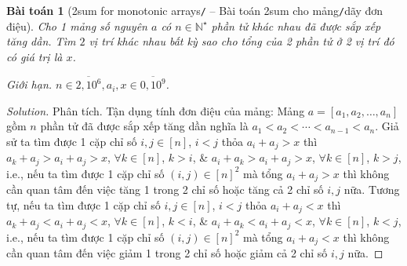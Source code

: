\documentclass{article}
\newtheorem{baitoan}{Bài toán}
\begin{document}
\begin{center}
\end{center}

\begin{baitoan}[{\sc2sum} for monotonic arrays{\tt/} -- Bài toán {\sc2sum} cho mảng{\tt/}dãy đơn điệu]
    Cho 1 mảng số nguyên $a$ có $n\in\mathbb{N}^\star$ phần tử khác nhau đã được sắp xếp tăng dần. Tìm $2$ vị trí khác nhau bất kỳ sao cho tổng của 2 phần tử ở 2 vị trí đó có giá trị là $x$.
    \item {\sf Giới hạn.} $n\in\overline{2,10^6},a_i,x\in\overline{0,10^9}$.
\end{baitoan}

\begin{proof}[Solution]
    \item {\sf Phân tích.} Tận dụng tính đơn điệu của mảng: Mảng $a = [a_1,a_2,\ldots,a_n]$ gồm $n$ phần tử đã được sắp xếp tăng dần nghĩa là $a_1 < a_2 < \cdots < a_{n-1} < a_n$. Giả sử ta tìm được 1 cặp chỉ số $i,j\in[n]$, $i < j$ thỏa $a_i + a_j > x$ thì $a_k + a_j > a_i + a_j > x$, $\forall k\in[n]$, $k > i$, \& $a_i + a_k > a_i + a_j > x$, $\forall k\in[n]$, $k > j$, i.e., nếu ta tìm được 1 cặp chỉ số $(i,j)\in[n]^2$ mà tổng $a_i + a_j > x$ thì không cần quan tâm đến việc tăng 1 trong 2 chỉ số hoặc tăng cả 2 chỉ số $i,j$ nữa. Tương tự, nếu ta tìm được 1 cặp chỉ số $i,j\in[n]$, $i < j$ thỏa $a_i + a_j < x$ thì $a_k + a_j < a_i + a_j < x$, $\forall k\in[n]$, $k < i$, \& $a_i + a_k < a_i + a_j < x$, $\forall k\in[n]$, $k < j$, i.e., nếu ta tìm được 1 cặp chỉ số $(i,j)\in[n]^2$ mà tổng $a_i + a_j < x$ thì không cần quan tâm đến việc giảm 1 trong 2 chỉ số hoặc giảm cả 2 chỉ số $i,j$ nữa.


\end{proof}
\end{document}
